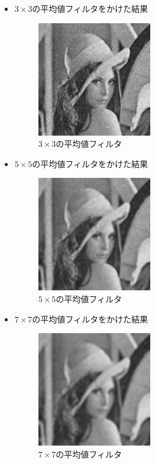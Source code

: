 \documentclass[a4paper,10pt,uplatex,dvipdfmx]{jsarticle}
\begin{document}
\begin{itemize}
  \item $3\times3$の平均値フィルタをかけた結果
    \begin{figure}[H]
      \centering
      \includegraphics[width=5cm]{../src/img/output_avg3x3.png}
      \caption{$3\times3$の平均値フィルタ}
    \end{figure}
  \item $5\times5$の平均値フィルタをかけた結果
    \begin{figure}[H]
      \centering
      \includegraphics[width=5cm]{../src/img/output_avg5x5.png}
      \caption{$5\times5$の平均値フィルタ}
    \end{figure}
  \item $7\times7$の平均値フィルタをかけた結果
    \begin{figure}[H]
      \centering
      \includegraphics[width=5cm]{../src/img/output_avg7x7.png}
      \caption{$7\times7$の平均値フィルタ}
    \end{figure}
\end{itemize}
\end{document}
